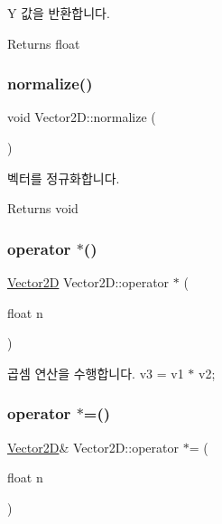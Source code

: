 Y 값을 반환합니다. \begin{DoxyReturn}{Returns}
float 
\end{DoxyReturn}
\mbox{\label{class_vector2_d_a39a3335f33d7e9850b99e4498ba4d856}} 
\subsubsection{\texorpdfstring{normalize()}{normalize()}}
{\footnotesize\ttfamily void Vector2\+D\+::normalize (\begin{DoxyParamCaption}{ }\end{DoxyParamCaption})\hspace{0.3cm}{\ttfamily [inline]}}

벡터를 정규화합니다. \begin{DoxyReturn}{Returns}
void 
\end{DoxyReturn}
\mbox{\label{class_vector2_d_ab276c6f20ca36f5d2db4dcbabae1239e}} 
\subsubsection{\texorpdfstring{operator $\ast$()}{operator *()}}
{\footnotesize\ttfamily \mbox{\hyperlink{class_vector2_d}{Vector2D}} Vector2\+D\+::operator $\ast$ (\begin{DoxyParamCaption}\item[{float}]{n }\end{DoxyParamCaption})\hspace{0.3cm}{\ttfamily [inline]}}

곱셈 연산을 수행합니다. v3 = v1 $\ast$ v2; \mbox{\label{class_vector2_d_a374c8cd012b412491c1205cdd99f120b}} 
\subsubsection{\texorpdfstring{operator $\ast$=()}{operator *=()}}
{\footnotesize\ttfamily \mbox{\hyperlink{class_vector2_d}{Vector2D}}\& Vector2\+D\+::operator $\ast$= (\begin{DoxyParamCaption}\item[{float}]{n }\end{DoxyParamCaption})\hspace{0.3cm}{\ttfamily [inline]}}


